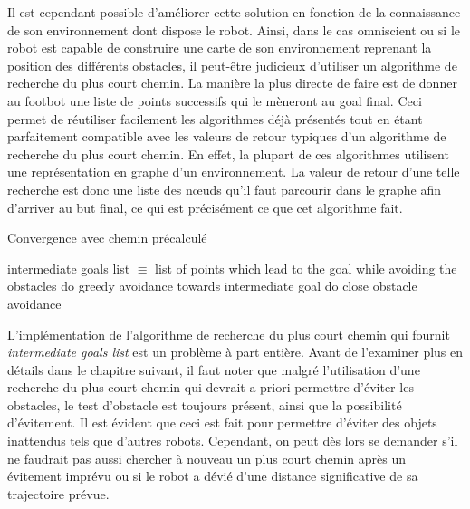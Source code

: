 Il est cependant possible d'améliorer cette solution en fonction de la connaissance de son environnement dont dispose le robot. Ainsi, dans le cas omniscient ou si le robot est capable de construire une carte de son environnement reprenant la position des différents obstacles, il peut-être judicieux d'utiliser un algorithme de recherche du plus court chemin. La manière la plus directe de faire est de donner au footbot une liste de points successifs qui le mèneront au goal final. Ceci  permet de réutiliser facilement les algorithmes déjà présentés tout en étant parfaitement compatible avec les valeurs de retour typiques d'un algorithme de recherche du plus court chemin. En effet, la plupart de ces algorithmes utilisent une représentation en graphe d'un environnement. La valeur de retour d'une telle recherche est donc une liste des nœuds qu'il faut parcourir dans le graphe afin d'arriver au but final, ce qui est précisément ce que cet algorithme fait.
\begin{algorithm}[H]
\caption{Convergence avec chemin précalculé}
\label{pathConvergence}
\begin{algorithmic}
  \REQUIRE intermediate goals list $\equiv$ list of points which lead to the goal while avoiding the obstacles
      \STATE do greedy avoidance towards intermediate goal
    \ELSE
      \STATE do close obstacle avoidance
    \ENDIF
  \ENDWHILE
  \ENDFOR
\end{algorithmic}
\end{algorithm}

L'implémentation de l'algorithme de recherche du plus court chemin qui fournit \emph{intermediate goals list} est un problème à part entière. Avant de l'examiner plus en détails dans le chapitre suivant, il faut noter que malgré l'utilisation d'une recherche du plus court chemin qui devrait a priori permettre d'éviter les obstacles, le test d'obstacle est toujours présent, ainsi que la possibilité d'évitement. Il est évident que ceci est fait pour permettre d'éviter des objets inattendus tels que d'autres robots. Cependant, on peut dès lors se demander s'il ne faudrait pas aussi chercher à nouveau un plus court chemin après un évitement imprévu ou si le robot a dévié d'une distance significative de sa trajectoire prévue.


